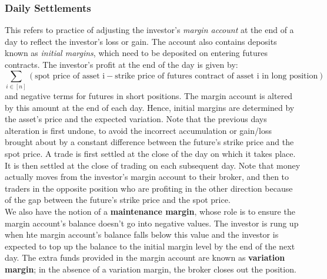 \documentclass{article}
\begin{document}
\subsubsection*{Daily Settlements}
This refers to practice of adjusting the investor's \emph{margin account} at the end of a day to reflect the investor's 
loss or gain. The account also contains deposits known as \emph{initial margins}, which need to be deposited on entering
futures contracts. The investor's profit at the end of the day is given by:
\begin{equation}
    \sum_{i \in [n]}{(\text{spot price of asset i} - \text{strike price of futures contract of asset i in long position})}
\end{equation}
and negative terms for futures in short positions.
The margin account is altered by this amount at the end of each day. Hence, initial margins are determined by the asset's price
and the expected variation. Note that the previous days alteration is first undone, to avoid the incorrect accumulation
or gain/loss brought about by a constant difference between the future's strike price and the spot price. A trade is first
settled at the close of the day on which it takes place. It is then settled at the
close of trading on each subsequent day. Note that money actually moves from the investor's margin account to their broker,
and then to traders in the opposite position who are profiting in the other direction because of the gap between the future's
strike price and the spot price.\\
We also have the notion of a \textbf{maintenance margin}, whose role is to ensure the margin account's balance doesn't go into 
negative values. The investor is rung up when hte margin account's balance falls below this value and the investor is expected
to top up the balance to the initial margin level by the end of the next day. The extra funds provided in the margin account 
are known as \textbf{variation margin}; in the absence of a variation margin, the broker closes out the position.
\end{document}
